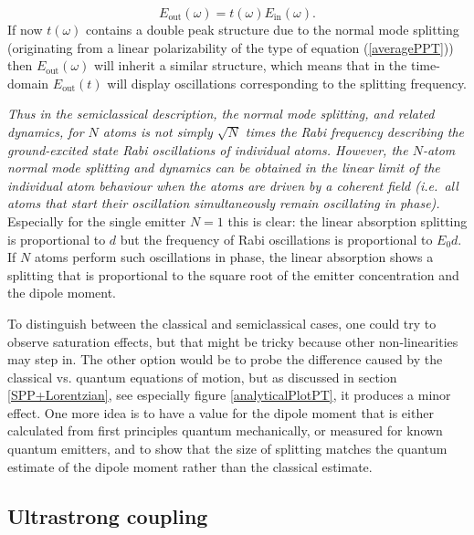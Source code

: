 \documentclass[12pt]{iopart}
\begin{document}
\begin{equation}
E_{\mathrm{out}}(\omega) = t(\omega) E_{\mathrm{in}}(\omega) . 
\end{equation}
If now $t(\omega)$ contains a double peak structure due to the normal mode splitting (originating from a linear polarizability of the type of equation (\ref{averagePPT})) then
$E_{\mathrm{out}}(\omega)$ will inherit a similar structure, which means that in the time-domain
$E_{\mathrm{out}}(t)$ will display oscillations corresponding to the splitting frequency.  

{\it Thus in the semiclassical description, the normal mode splitting, and related dynamics, for $N$ atoms is not simply $\sqrt{N}$ times the Rabi frequency describing the ground-excited state Rabi oscillations of individual atoms. However, the $N$-atom normal mode splitting and dynamics can be obtained in the linear limit of the individual atom behaviour when the atoms are driven by a coherent field (i.e.\ all atoms that start their oscillation simultaneously remain oscillating in phase).} Especially for the single emitter $N=1$ this is clear: the linear absorption splitting is proportional to $d$ but the frequency of Rabi oscillations is proportional to $E_0 d$. If $N$ atoms perform such oscillations in phase, the linear absorption shows a splitting that is proportional to the square root of the emitter concentration and the
dipole moment. 

To distinguish between the classical and semiclassical cases, one could try to observe saturation effects, but that might be tricky because other non-linearities may step in. The other option would be to probe the difference caused by the classical vs. quantum equations of motion, but as discussed in section \ref{SPP+Lorentzian}, see especially figure \ref{analyticalPlotPT}, it produces a minor effect. One more idea is to have a value for the dipole moment that is either calculated from first principles quantum mechanically, or measured for known quantum emitters, and to show that the size of splitting matches the quantum estimate of the dipole moment rather than the classical estimate. 


\subsection{Ultrastrong coupling} \label{ultrastrong}
\end{document}

